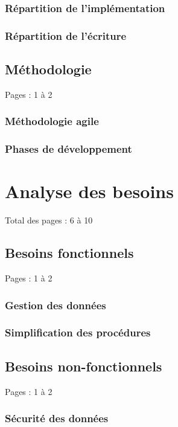 \documentclass{eplmastersthesis_FR}
\begin{document}
			\subsection*{Répartition de l'implémentation}
			\subsection*{Répartition de l'écriture}

		\section{Méthodologie}

			Pages : 1 à 2

			\subsection*{Méthodologie agile}
			\subsection*{Phases de développement}

	\chapter{Analyse des besoins}

		Total des pages : 6 à 10

		\section{Besoins fonctionnels}

			Pages : 1 à 2

			\subsection*{Gestion des données}
			\subsection*{Simplification des procédures}

		\section{Besoins non-fonctionnels}

			Pages : 1 à 2

			\subsection*{Sécurité des données}
\end{document}
